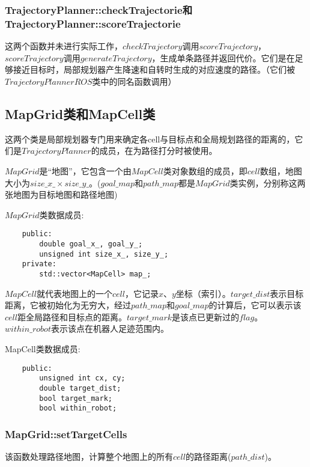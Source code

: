 \documentclass[9pt, oneside]{book}
\begin{document}
\subsubsection{TrajectoryPlanner::checkTrajectorie和TrajectoryPlanner::scoreTrajectorie}

这两个函数并未进行实际工作，$checkTrajectory$调用$scoreTrajectory$，$scoreTrajectory$调用$generateTrajectory$，生成单条路径并返回代价。它们是在足够接近目标时，局部规划器产生降速和自转时生成的对应速度的路径。（它们被$TrajectoryPlannerROS$类中的同名函数调用）

\subsection{MapGrid类和MapCell类}

这两个类是局部规划器专门用来确定各cell与目标点和全局规划路径的距离的，它们是$TrajectoryPlanner$的成员，在为路径打分时被使用。

$MapGrid$是“地图”，它包含一个由$MapCell$类对象数组的成员，即$cell$数组，地图大小为$size\_x\_ × size\_y\_$。($goal\_map$和$path\_map$都是$MapGrid$类实例，分别称这两张地图为目标地图和路径地图)

$MapGrid$类数据成员:

\small
\begin{verbatim}
    public:
        double goal_x_, goal_y_; 
        unsigned int size_x_, size_y_; 
    private:
        std::vector<MapCell> map_; 
\end{verbatim}
\normalsize

$MapCell$就代表地图上的一个$cell$，它记录$x$、$y$坐标（索引）。$target\_dist$表示目标距离，它被初始化为无穷大，经过$path\_map$和$goal\_map$的计算后，它可以表示该$cell$距全局路径和目标点的距离。$target\_mark$是该点已更新过的$flag$。$within\_robot$表示该点在机器人足迹范围内。

MapCell类数据成员:

\small
\begin{verbatim}
    public:
        unsigned int cx, cy;
        double target_dist;
        bool target_mark;
        bool within_robot;
\end{verbatim}
\normalsize

\subsubsection{MapGrid::setTargetCells}

该函数处理路径地图，计算整个地图上的所有$cell$的路径距离($path\_dist$)。
\end{document}
